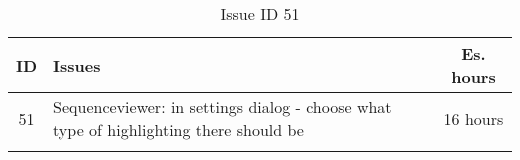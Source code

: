 \begin{longtable} { | c | p{12cm} | c | } 
\hline
	ID 	&	Issues	&		 Es. hours \\\hline
	51 	&	Sequenceviewer: in settings dialog - choose what type of highlighting there should be	&	16 hours \\\hline
\caption{Issue ID 51}
\label{tab:spr3_SVsettingsdialog}
\end{longtable}